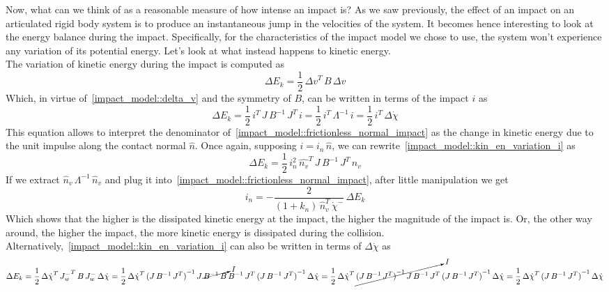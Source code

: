 \documentclass[letterpaper, 10 pt, conference]{ieeeconf}  %
\begin{document}
Now, what can we think of as a reasonable measure of how intense an impact is? As we saw previously, the effect of an impact on an articulated rigid body system is to produce an instantaneous jump in the velocities of the system. It becomes hence interesting to look at the energy balance during the impact. Specifically, for the characteristics of the impact model we chose to use,  the system won't experience any variation of its potential energy. Let's look at what instead happens to kinetic energy.\\
The variation of kinetic energy during the impact is computed as
\begin{equation}\label{impact_model::kin_en_variation_raw}
\Delta E_k = \dfrac{1}{2}\,{\Delta v}^T\,B\,\Delta v
\end{equation}
Which, in virtue of~\eqref{impact_model::delta_v} and the symmetry of $B$, can be written in terms of the impact $i$ as
\begin{equation}\label{impact_model::kin_en_variation_i}
\Delta E_k = \dfrac{1}{2}\,i^T\,J\,B^{-1}\,J^T\,i = \dfrac{1}{2}\,i^T\,\Lambda^{-1}\,i = \dfrac{1}{2}\,i^T\,\Delta\dot{\chi}
\end{equation}
This equation allows to interpret the denominator of~\eqref{impact_model::frictionless_normal_impact} as the change in kinetic energy due to the unit impulse along the contact normal $\hat{n}$. Once again, supposing $i = i_n\,\hat{n}$, we can rewrite~\eqref{impact_model::kin_en_variation_i} as
\begin{equation}\label{impact_model::kin_en_variation_in}
\Delta E_k = \dfrac{1}{2}\,i_n^2\,\hat{n_v}^T\,J\,B^{-1}\,J^T\,\hat{n}_v 
\end{equation}
If we extract $\hat{n}_v\,\Lambda^{-1}\,\hat{n}_v$ and plug it into~\eqref{impact_model::frictionless_normal_impact}, after little manipulation we get
\begin{equation}\label{impact_model::frictionless_normal_impact_ek}
i_n = - \dfrac{2}{\left(1 + k_n\right)\,\hat{n}_v^T\,\dot{\chi}^{-}}\,\Delta E_k
\end{equation}
Which shows that the higher is the dissipated kinetic energy at the impact, the higher the magnitude of the impact is. Or, the other way around, the higher the impact, the more kinetic energy is dissipated during the collision.\\
Alternatively,~\eqref{impact_model::kin_en_variation_i} can also be written in terms of $\Delta \dot{\chi}$ as
\begin{dmath*}\label{impact_model::kin_en_variation_chi}
\Delta E_k = \dfrac{1}{2}\,{\Delta\dot{\chi} }^T\,{J^{-}_{w}}^T\,B\,{J^{-}_{w}}\,\Delta\dot{\chi} = 
\dfrac{1}{2}\,{\Delta\dot{\chi} }^T\,{( J\, B^{-1}\,J^T)}^{-1}\,J\,\cancelto{I}{B^{-1}\,B}\,B^{-1}\,J^T\,{( J\, B^{-1}\,J^T)}^{-1}\,\Delta\dot{\chi} = 
\dfrac{1}{2}\,{\Delta\dot{\chi} }^T\,\cancelto{I}{{( J\, B^{-1}\,J^T)}^{-1}\,J\,B^{-1}\,J^T}\,{( J\, B^{-1}\,J^T)}^{-1}\,\Delta\dot{\chi} = 
\dfrac{1}{2}\,{\Delta\dot{\chi} }^T\,{( J\, B^{-1}\,J^T)}^{-1}\,\Delta\dot{\chi}
\end{dmath*}
\end{document}
